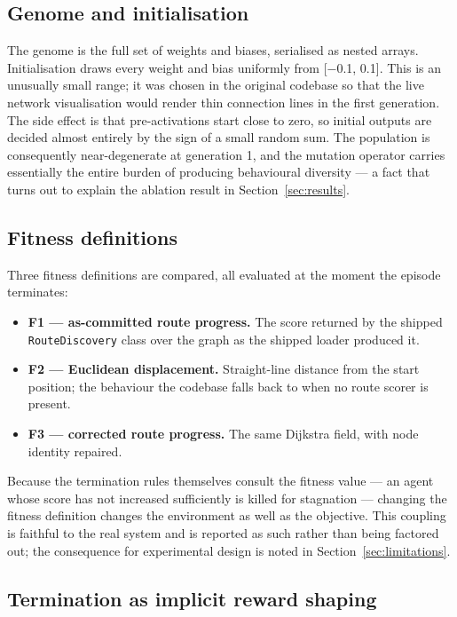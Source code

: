 \documentclass[conference]{IEEEtran}
\begin{document}
\label{sec:method}

\subsection{Genome and initialisation}

The genome is the full set of weights and biases, serialised as nested arrays. Initialisation draws every weight and bias uniformly from [−0.1, 0.1]. This is an unusually small range; it was chosen in the original codebase so that the live network visualisation would render thin connection lines in the first generation. The side effect is that pre-activations start close to zero, so initial outputs are decided almost entirely by the sign of a small random sum. The population is consequently near-degenerate at generation 1, and the mutation operator carries essentially the entire burden of producing behavioural diversity — a fact that turns out to explain the ablation result in Section~\ref{sec:results}.

\subsection{Fitness definitions}

Three fitness definitions are compared, all evaluated at the moment the episode terminates:

\begin{itemize}
\item \textbf{F1 — as-committed route progress.} The score returned by the shipped \texttt{RouteDiscovery} class over the graph as the shipped loader produced it.
\item \textbf{F2 — Euclidean displacement.} Straight-line distance from the start position; the behaviour the codebase falls back to when no route scorer is present.
\item \textbf{F3 — corrected route progress.} The same Dijkstra field, with node identity repaired.
\end{itemize}

Because the termination rules themselves consult the fitness value — an agent whose score has not increased sufficiently is killed for stagnation — changing the fitness definition changes the environment as well as the objective. This coupling is faithful to the real system and is reported as such rather than being factored out; the consequence for experimental design is noted in Section~\ref{sec:limitations}.

\subsection{Termination as implicit reward shaping}
\end{document}
